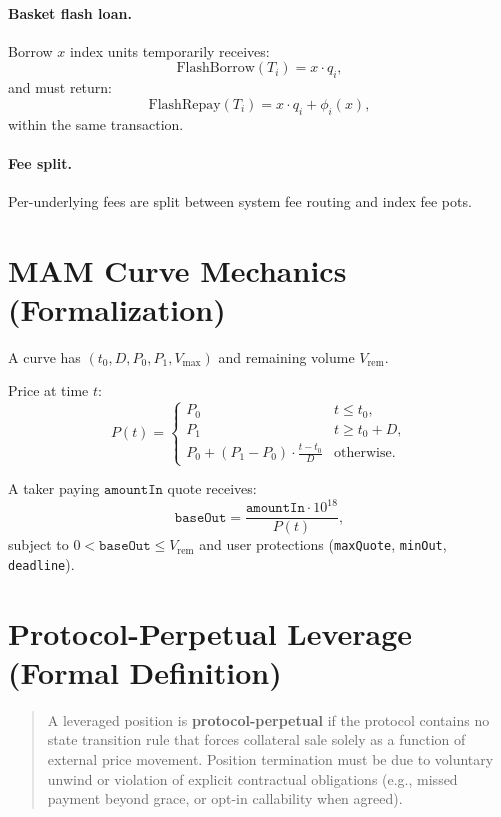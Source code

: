 \documentclass[version=preprint]{iacrcc}
\begin{document}
\paragraph{Basket flash loan.}
Borrow $x$ index units temporarily receives:
\[
\text{FlashBorrow}(T_i)=x\cdot q_i,
\]
and must return:
\[
\text{FlashRepay}(T_i)=x\cdot q_i + \phi_i(x),
\]
within the same transaction.

\paragraph{Fee split.}
Per-underlying fees are split between system fee routing and index fee pots.

\section{MAM Curve Mechanics (Formalization)}

A curve has $(t_0, D, P_0, P_1, V_{\max})$ and remaining volume $V_{\text{rem}}$.

Price at time $t$:
\[
P(t)=
\begin{cases}
P_0 & t \le t_0,\\
P_1 & t \ge t_0 + D,\\
P_0 + (P_1-P_0)\cdot\frac{t-t_0}{D} & \text{otherwise}.
\end{cases}
\]

A taker paying $\texttt{amountIn}$ quote receives:
\[
\texttt{baseOut}=\frac{\texttt{amountIn}\cdot 10^{18}}{P(t)},
\]
subject to $0 < \texttt{baseOut} \le V_{\text{rem}}$ and user protections (\texttt{maxQuote}, \texttt{minOut}, \texttt{deadline}).

\section{Protocol-Perpetual Leverage (Formal Definition)}

\begin{quote}
A leveraged position is \textbf{protocol-perpetual} if the protocol contains no state transition rule that forces collateral sale solely as a function of external price movement. Position termination must be due to voluntary unwind or violation of explicit contractual obligations (e.g., missed payment beyond grace, or opt-in callability when agreed).
\end{quote}
\end{document}
